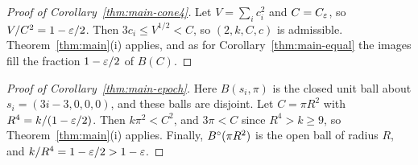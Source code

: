 \begin{proof}[Proof of Corollary~\ref{thm:main-cone4}]
Let $V=\sum_ic_i^2$ and $C=C_\varepsilon$, so $V/C^2=1-\varepsilon/2$. Then $3c_i\le V^{1/2}<C$, so $(2,k,C,c)$ is admissible.
Theorem~\ref{thm:main}(i) applies, and as for Corollary~\ref{thm:main-equal} the images fill the fraction $1-\varepsilon/2$ of
$B(C)$.
\end{proof}

\begin{proof}[Proof of Corollary~\ref{thm:main-epoch}]
Here $B(s_i,\pi)$ is the closed unit ball about $s_i=(3i-3,0,0,0)$, and these balls are disjoint. Let $C=\pi R^2$ with
$R^4=k/(1-\varepsilon/2)$. Then $k\pi^2<C^2$, and $3\pi<C$ since $R^4>k\ge9$, so Theorem~\ref{thm:main}(i) applies. Finally,
$B^{\circ}(\pi R^2)$ is the open ball of radius $R$, and $k/R^4=1-\varepsilon/2>1-\varepsilon$.
\end{proof}
